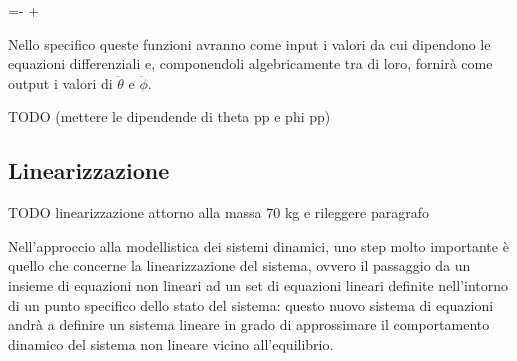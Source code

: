 {}{
}=-
{}+
{\left[
	\begin{array}{c}
	$C_m \\
	-C_m$ 
	\end{array}
\right]}

Nello specifico queste funzioni avranno come input i valori da cui dipendono le equazioni differenziali e, componendoli algebricamente tra di loro, fornirà come output i valori di $\ddot{\theta}$ e $\ddot{\phi}$.

TODO (mettere le dipendende di theta pp e phi pp)
\subsection{Linearizzazione}
TODO linearizzazione attorno alla massa 70 kg e rileggere paragrafo

Nell'approccio alla modellistica dei sistemi dinamici, uno step molto importante è quello che concerne la linearizzazione del sistema, ovvero il passaggio da un insieme di equazioni non lineari ad un set di equazioni lineari definite nell'intorno di un punto specifico dello stato del sistema: questo nuovo sistema di equazioni andrà a definire un sistema lineare in grado di approssimare il comportamento dinamico del sistema non lineare vicino all'equilibrio.

